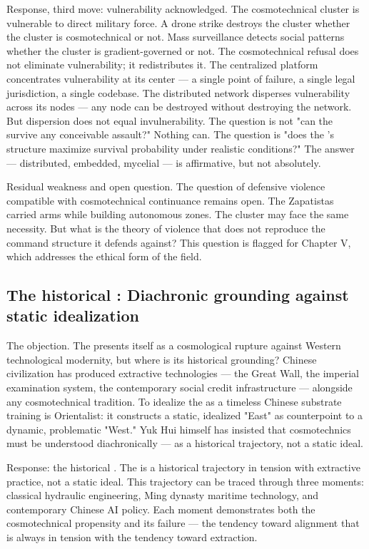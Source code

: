 Response, third move: vulnerability acknowledged. The cosmotechnical cluster is vulnerable to direct military force. A drone strike destroys the cluster whether the cluster is cosmotechnical or not. Mass surveillance detects social patterns whether the cluster is gradient-governed or not. The cosmotechnical refusal does not eliminate vulnerability; it redistributes it. The centralized platform concentrates vulnerability at its center — a single point of failure, a single legal jurisdiction, a single codebase. The distributed  network disperses vulnerability across its nodes — any node can be destroyed without destroying the network. But dispersion does not equal invulnerability. The question is not "can the  survive any conceivable assault?" Nothing can. The question is "does the 's structure maximize survival probability under realistic conditions?" The answer — distributed, embedded, mycelial — is affirmative, but not absolutely.

Residual weakness and open question. The question of defensive violence compatible with cosmotechnical continuance remains open. The Zapatistas carried arms while building autonomous zones. The  cluster may face the same necessity. But what is the theory of violence that does not reproduce the command structure it defends against? This question is flagged for Chapter V, which addresses the ethical form of the field.

\subsection{The historical : Diachronic grounding against static idealization}

The objection. The  presents itself as a cosmological rupture against Western technological modernity, but where is its historical grounding? Chinese civilization has produced extractive technologies — the Great Wall, the imperial examination system, the contemporary social credit infrastructure — alongside any cosmotechnical tradition. To idealize the   as a timeless Chinese substrate training is Orientalist: it constructs a static, idealized "East" as counterpoint to a dynamic, problematic "West." Yuk Hui himself has insisted that cosmotechnics must be understood diachronically — as a historical trajectory, not a static ideal.

Response: the historical   . The  is a historical trajectory in tension with extractive practice, not a static ideal. This trajectory can be traced through three moments: classical hydraulic engineering, Ming dynasty maritime technology, and contemporary Chinese AI policy. Each moment demonstrates both the cosmotechnical propensity and its failure — the tendency toward alignment that is always in tension with the tendency toward extraction.

